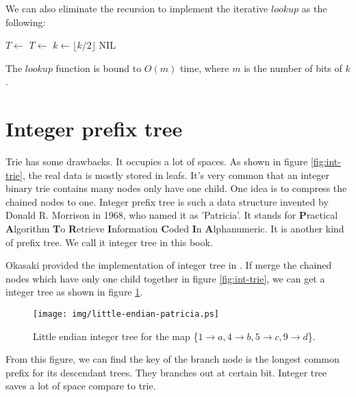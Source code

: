 \documentclass[b5paper]{article}
\begin{document}
We can also eliminate the recursion to implement the iterative $lookup$ as the following:

\begin{algorithmic}[1]
      \State $T \gets$ 
    \Else
      \State $T \gets$ 
    \EndIf
    \State $k \gets \lfloor k/2 \rfloor$
  \EndWhile
    \State \Return {}
  \Else
    \State \Return NIL \EndIf
\EndFunction
\end{algorithmic}

The $lookup$ function is bound to $O(m)$ time, where $m$ is the number of bits of $k$.

\section{Integer prefix tree}
\label{int-patricia}
 

Trie has some drawbacks. It occupies a lot of
spaces. As shown in figure \ref{fig:int-trie}, the real data is mostly stored in leafs.
It's very common that an integer binary trie contains many nodes only have one child.
One idea is to compress the chained nodes to one.
Integer prefix tree is such a data structure invented by
Donald R. Morrison in 1968, who named it as 'Patricia'. It stands for \textbf{P}ractical \textbf{A}lgorithm \textbf{T}o \textbf{R}etrieve \textbf{I}nformation \textbf{C}oded \textbf{I}n \textbf{A}lphanumeric\cite{patricia-morrison}. It is another kind of prefix tree. We call it integer tree in this book.

Okasaki provided the implementation of integer tree in \cite{okasaki-int-map}.
If merge the chained nodes which have only one child together in figure \ref{fig:int-trie}, we can get a integer tree as shown in figure \ref{fig:little-endian-patricia}.

\begin{figure}[htbp]
  \centering
  \texttt{[image: img/little-endian-patricia.ps]}
  \caption{Little endian integer tree for the map
     \{$ 1 \rightarrow a, 4 \rightarrow b, 5 \rightarrow c, 9 \rightarrow d$\}.}
  \label{fig:little-endian-patricia}
\end{figure}

From this figure, we can find the key of the branch node is the
longest common prefix for its descendant trees.
They branches out at certain bit. Integer tree saves a lot of space compare
to trie.
\end{document}
